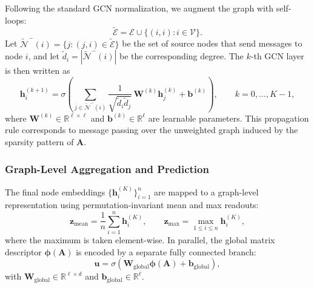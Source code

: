 \documentclass[11pt,a4paper]{article}
\theoremstyle{plain}
\theoremstyle{definition}
\theoremstyle{remark}
\begin{document}
Following the standard GCN normalization, we augment the graph with self-loops:
\[
\tilde{\mathcal{E}}
=
\mathcal{E}
\cup
\{(i,i):i\in\mathcal{V}\}.
\]
Let $\tilde{\mathcal{N}}^{-}(i) = \{j:(j,i)\in\tilde{\mathcal{E}}\}$
be the set of source nodes that send messages to node $i$, and let
$\tilde d_i = |\tilde{\mathcal{N}}^{-}(i)|$ be the corresponding degree. The $k$-th GCN layer is then written as
\begin{equation}
\mathbf{h}_i^{(k+1)}
=
\sigma\left(
\sum_{j\in \tilde{\mathcal{N}}^{-}(i)}
\frac{1}{\sqrt{\tilde d_i\tilde d_j}}\,
\mathbf{W}^{(k)}\mathbf{h}_j^{(k)}
+
\mathbf{b}^{(k)}
\right),
\qquad
k=0,\ldots,K-1,
\label{eq:gcn_propagation}
\end{equation}
where $\mathbf{W}^{(k)}\in\mathbb{R}^{\ell\times\ell}$ and $\mathbf{b}^{(k)}\in\mathbb{R}^{\ell}$ are learnable parameters. This propagation rule corresponds to message passing over the unweighted graph induced by the sparsity pattern of $\mathbf{A}$.

\subsubsection{Graph-Level Aggregation and Prediction}

The final node embeddings $\{\mathbf{h}_i^{(K)}\}_{i=1}^n$ are mapped to a graph-level representation using permutation-invariant mean and max readouts:
\begin{equation}
\mathbf{z}_{\mathrm{mean}}
=
\frac{1}{n}
\sum_{i=1}^n
\mathbf{h}_i^{(K)},
\qquad
\mathbf{z}_{\max}
=
\max_{1\leq i\leq n}
\mathbf{h}_i^{(K)},
\label{eq:graph_pooling}
\end{equation}
where the maximum is taken element-wise. In parallel, the global matrix descriptor $\bm{\phi}(\mathbf{A})$ is encoded by a separate fully connected branch:
\begin{equation}
\mathbf{u}
=
\sigma\left(
\mathbf{W}_{\mathrm{global}}\bm{\phi}(\mathbf{A})
+
\mathbf{b}_{\mathrm{global}}
\right),
\label{eq:global_encoder}
\end{equation}
with $\mathbf{W}_{\mathrm{global}}\in\mathbb{R}^{\ell\times d}$ and $\mathbf{b}_{\mathrm{global}}\in\mathbb{R}^{\ell}$.
\end{document}
